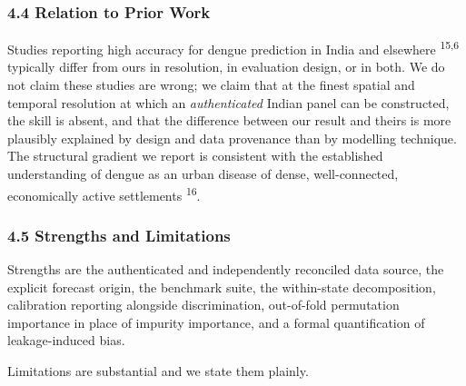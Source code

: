 \documentclass[
  10pt,
  twocolumn]{article}
\begin{document}
\subsubsection{4.4 Relation to Prior Work}\label{relation-to-prior-work}

Studies reporting high accuracy for dengue prediction in India and
elsewhere \textsuperscript{15,6} typically differ from ours in
resolution, in evaluation design, or in both. We do not claim these
studies are wrong; we claim that at the finest spatial and temporal
resolution at which an \emph{authenticated} Indian panel can be
constructed, the skill is absent, and that the difference between our
result and theirs is more plausibly explained by design and data
provenance than by modelling technique. The structural gradient we
report is consistent with the established understanding of dengue as an
urban disease of dense, well-connected, economically active settlements
\textsuperscript{16}.

\subsubsection{4.5 Strengths and
Limitations}\label{strengths-and-limitations}

Strengths are the authenticated and independently reconciled data
source, the explicit forecast origin, the benchmark suite, the
within-state decomposition, calibration reporting alongside
discrimination, out-of-fold permutation importance in place of impurity
importance, and a formal quantification of leakage-induced bias.

Limitations are substantial and we state them plainly.
\end{document}
